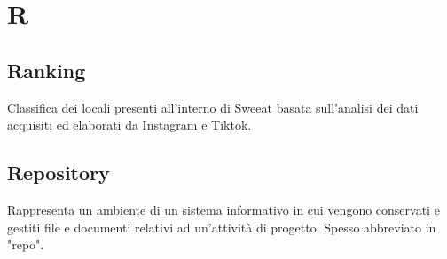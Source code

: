 \section{R}

\subsection{Ranking} Classifica dei locali presenti all’interno di Sweeat basata sull’analisi dei dati acquisiti ed elaborati da Instagram e Tiktok.

\subsection{Repository}
Rappresenta un ambiente di un sistema informativo in cui vengono conservati e gestiti file e documenti relativi ad un’attività di progetto. Spesso abbreviato in "repo".

\clearpage